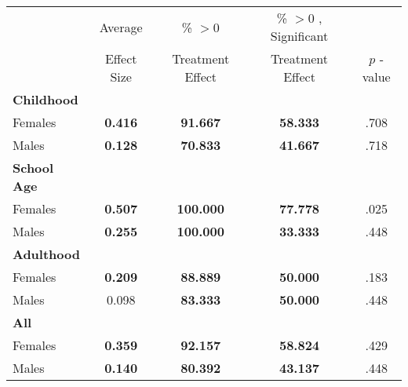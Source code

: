\begin{tabular}{l c c c c}
\toprule
 & Average & \% $ >0 $ & \% $ >0 $ , Significant & \citet{Rosenbaum_2005_Distribution_JRSS} \\
 & Effect Size & Treatment Effect & Treatment Effect & $ p $ -value \\
\midrule
\textbf{Childhood} & & & & \\
\quad Females &  \textbf{    0.416} & \textbf{   91.667} & \textbf{   58.333} & .708 \\
\quad Males &  \textbf{    0.128} & \textbf{   70.833} & \textbf{   41.667} & .718 \\
\midrule
\textbf{School Age} & & & & \\
\quad Females &  \textbf{    0.507} & \textbf{  100.000} & \textbf{   77.778} & .025 \\
\quad Males &  \textbf{    0.255} & \textbf{  100.000} & \textbf{   33.333} & .448 \\
\midrule
\textbf{Adulthood} & & & & \\
\quad Females &  \textbf{    0.209} & \textbf{   88.889} & \textbf{   50.000} & .183 \\
\quad Males &      0.098 & \textbf{   83.333} & \textbf{   50.000} & .448 \\
\midrule
\textbf{All} & & & & \\
\quad Females &  \textbf{    0.359} & \textbf{   92.157} & \textbf{   58.824} & .429 \\
\quad Males &  \textbf{    0.140} & \textbf{   80.392} & \textbf{   43.137} & .448 \\
\bottomrule
\end{tabular}
